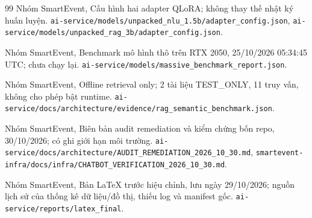 \begin{thebibliography}{99}
Nhóm SmartEvent, Cấu hình hai adapter QLoRA; không thay thế nhật ký huấn luyện. \nolinkurl{ai-service/models/unpacked_nlu_1.5b/adapter_config.json}, \nolinkurl{ai-service/models/unpacked_rag_3b/adapter_config.json}.

Nhóm SmartEvent, Benchmark mô hình thô trên RTX 2050, 25/10/2026 05:34:45 UTC; chưa chạy lại. \nolinkurl{ai-service/models/massive_benchmark_report.json}.

Nhóm SmartEvent, Offline retrieval only; 2 tài liệu TEST\_ONLY, 11 truy vấn, không cho phép bật runtime. \nolinkurl{ai-service/docs/architecture/evidence/rag_semantic_benchmark.json}.

Nhóm SmartEvent, Biên bản audit remediation và kiểm chứng bốn repo, 30/10/2026; có ghi giới hạn môi trường. \nolinkurl{ai-service/docs/architecture/AUDIT_REMEDIATION_2026_10_30.md}, \nolinkurl{smartevent-infra/docs/infra/CHATBOT_VERIFICATION_2026_10_30.md}.

Nhóm SmartEvent, Bản LaTeX trước hiệu chỉnh, lưu ngày 29/10/2026; nguồn lịch sử của thống kê dữ liệu/đồ thị, thiếu log và manifest gốc. \nolinkurl{ai-service/reports/latex_final}.

\end{thebibliography}
